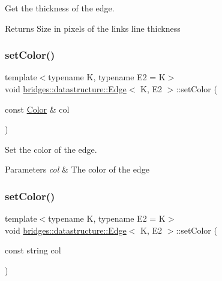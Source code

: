 Get the thickness of the edge. 

\begin{DoxyReturn}{Returns}
Size in pixels of the link\textquotesingle{}s line thickness 
\end{DoxyReturn}
\mbox{\label{classbridges_1_1datastructure_1_1_edge_a9eab71fed936587b2a3109d3df3c46fb}} 
\subsubsection{\texorpdfstring{set\+Color()}{setColor()}\hspace{0.1cm}{\footnotesize\ttfamily [1/2]}}
{\footnotesize\ttfamily template$<$typename K, typename E2 = K$>$ \\
void \hyperlink{classbridges_1_1datastructure_1_1_edge}{bridges\+::datastructure\+::\+Edge}$<$ K, E2 $>$\+::set\+Color (\begin{DoxyParamCaption}\item[{const \hyperlink{classbridges_1_1datastructure_1_1_color}{Color} \&}]{col }\end{DoxyParamCaption})\hspace{0.3cm}{\ttfamily [inline]}}



Set the color of the edge. 


\begin{DoxyParams}{Parameters}
{\em col} & The color of the edge \\
\hline
\end{DoxyParams}
\mbox{\label{classbridges_1_1datastructure_1_1_edge_a5a38f46e9662624af4de9fcf596c4783}} 
\subsubsection{\texorpdfstring{set\+Color()}{setColor()}\hspace{0.1cm}{\footnotesize\ttfamily [2/2]}}
{\footnotesize\ttfamily template$<$typename K, typename E2 = K$>$ \\
void \hyperlink{classbridges_1_1datastructure_1_1_edge}{bridges\+::datastructure\+::\+Edge}$<$ K, E2 $>$\+::set\+Color (\begin{DoxyParamCaption}\item[{const string}]{col }\end{DoxyParamCaption})\hspace{0.3cm}{\ttfamily [inline]}}



